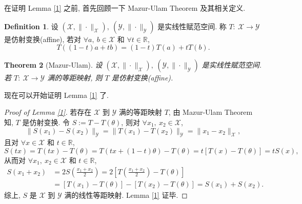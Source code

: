 \documentclass[a4paper,11pt]{article}
\newtheorem{theorem}{Theorem}[section]
\theoremstyle{definition}
\newtheorem{definition}[theorem]{Definition}
\begin{document}
\begin{CJK*}{UTF8}{gbsn}
在证明 Lemma \ref{1} 之前, 首先回顾一下 Mazur-Ulam Theorem 及其相关定义.

\begin{definition}
    设 $ (\mathscr{X}, \| \cdot \|_\mathscr{X}),\ (\mathscr{Y}, \| \cdot \|_\mathscr{Y}) $ 是实线性赋范空间.
    称 $ T :\ \mathscr{X} \to \mathscr{Y} $ 是仿射变换(affine), 若对 $ \forall a,\ b \in \mathcal{X} $
    和 $ \forall t \in \mathbb{R} $,
    $$
        T((1 - t) a + t b) = (1 - t) T(a) + t T(b).
    $$
\end{definition}

\begin{theorem}[Mazur-Ulam]
    设 $ (\mathscr{X}, \| \cdot \|_\mathscr{X}),\ (\mathscr{Y}, \| \cdot \|_\mathscr{Y}) $ 是实线性赋范空间.
    若 $ T :\ \mathscr{X} \to \mathscr{Y} $ 满的等距映射, 则 $ T $ 是仿射变换(affine).
\end{theorem}

现在可以开始证明 Lemma \ref{1} 了.

\begin{proof}[Proof of Lemma \ref{1}]
    若存在 $ \mathscr{X} $ 到 $ \mathscr{Y} $ 满的等距映射 $ T $, 由 Mazur-Ulam Theorem 知,
    $ T $ 是仿射变换. 令 $ S := T - T(\theta) $, 则对 $ \forall x_1,\ x_2 \in \mathcal{X} $,
    $$
        \| S(x_1) - S(x_2) \|_\mathscr{Y} 
            = \| T(x_1) - T(x_2) \|_\mathscr{Y} 
            = \| x_1 - x_2 \|_\mathscr{X},
    $$
    且对 $ \forall x \in \mathcal{X} $ 和 $ t \in \mathbb{R} $,
    $$
        S(t x) = T(t x) - T(\theta)
                 = T(t x + (1 - t) \theta) - T(\theta)
                 = t[T(x) - T(\theta)]
                 = t S(x),
    $$
    从而对 $ \forall x_1,\ x_2 \in \mathcal{X} $ 和 $ t \in \mathbb{R} $,
    \begin{align*}
        S(x_1 + x_2) &= 2 S \left( \frac{x_1 + x_2}{2} \right) 
                     = 2 \left[ T \left( \frac{x_1 + x_2}{2} \right) - T(\theta) \right] \\
                     &= [T(x_1) - T(\theta)] - [T(x_2) - T(\theta)]
                     = S(x_1) + S(x_2).
    \end{align*}
    综上, $ S $ 是 $ \mathscr{X} $ 到 $ \mathscr{Y} $ 满的线性等距映射. Lemma \ref{1} 证毕.
\end{proof}

\end{CJK*}
\end{document}
